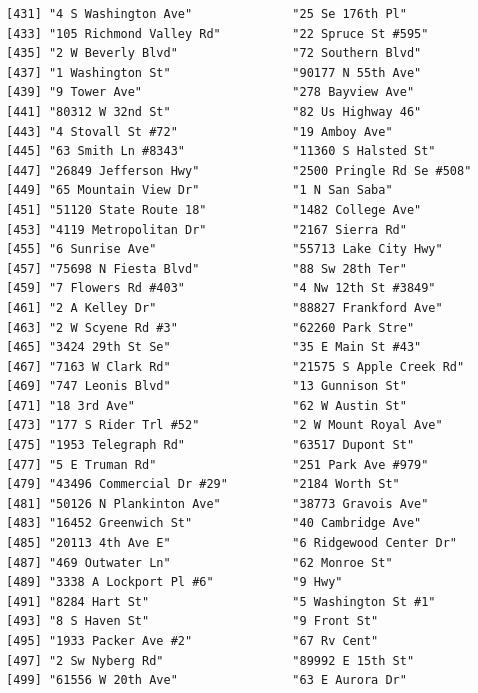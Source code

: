 \documentclass[
  12pt,
]{article}
\begin{document}
\begin{verbatim}
[431] "4 S Washington Ave"              "25 Se 176th Pl"                 
[433] "105 Richmond Valley Rd"          "22 Spruce St #595"              
[435] "2 W Beverly Blvd"                "72 Southern Blvd"               
[437] "1 Washington St"                 "90177 N 55th Ave"               
[439] "9 Tower Ave"                     "278 Bayview Ave"                
[441] "80312 W 32nd St"                 "82 Us Highway 46"               
[443] "4 Stovall St #72"                "19 Amboy Ave"                   
[445] "63 Smith Ln #8343"               "11360 S Halsted St"             
[447] "26849 Jefferson Hwy"             "2500 Pringle Rd Se #508"        
[449] "65 Mountain View Dr"             "1 N San Saba"                   
[451] "51120 State Route 18"            "1482 College Ave"               
[453] "4119 Metropolitan Dr"            "2167 Sierra Rd"                 
[455] "6 Sunrise Ave"                   "55713 Lake City Hwy"            
[457] "75698 N Fiesta Blvd"             "88 Sw 28th Ter"                 
[459] "7 Flowers Rd #403"               "4 Nw 12th St #3849"             
[461] "2 A Kelley Dr"                   "88827 Frankford Ave"            
[463] "2 W Scyene Rd #3"                "62260 Park Stre"                
[465] "3424 29th St Se"                 "35 E Main St #43"               
[467] "7163 W Clark Rd"                 "21575 S Apple Creek Rd"         
[469] "747 Leonis Blvd"                 "13 Gunnison St"                 
[471] "18 3rd Ave"                      "62 W Austin St"                 
[473] "177 S Rider Trl #52"             "2 W Mount Royal Ave"            
[475] "1953 Telegraph Rd"               "63517 Dupont St"                
[477] "5 E Truman Rd"                   "251 Park Ave #979"              
[479] "43496 Commercial Dr #29"         "2184 Worth St"                  
[481] "50126 N Plankinton Ave"          "38773 Gravois Ave"              
[483] "16452 Greenwich St"              "40 Cambridge Ave"               
[485] "20113 4th Ave E"                 "6 Ridgewood Center Dr"          
[487] "469 Outwater Ln"                 "62 Monroe St"                   
[489] "3338 A Lockport Pl #6"           "9 Hwy"                          
[491] "8284 Hart St"                    "5 Washington St #1"             
[493] "8 S Haven St"                    "9 Front St"                     
[495] "1933 Packer Ave #2"              "67 Rv Cent"                     
[497] "2 Sw Nyberg Rd"                  "89992 E 15th St"                
[499] "61556 W 20th Ave"                "63 E Aurora Dr"                 
\end{verbatim}
\end{document}

